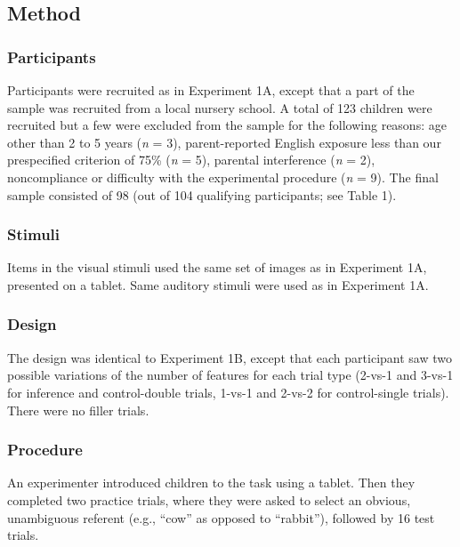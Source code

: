 \documentclass[a4paper,man,apacite,floatsintext]{apa6}
\begin{document}
\subsection{Method}\label{method-2}

\subsubsection{Participants}\label{participants-2}

Participants were recruited as in Experiment 1A, except that a part of
the sample was recruited from a local nursery school. A total of 123
children were recruited but a few were excluded from the sample for the
following reasons: age other than 2 to 5 years (\emph{n} = 3),
parent-reported English exposure less than our prespecified criterion of
75\% (\emph{n} = 5), parental interference (\emph{n} = 2), noncompliance
or difficulty with the experimental procedure (\emph{n} = 9). The final
sample consisted of 98 (out of 104 qualifying participants; see Table
1).

\subsubsection{Stimuli}\label{stimuli-1}

Items in the visual stimuli used the same set of images as in Experiment
1A, presented on a tablet. Same auditory stimuli were used as in
Experiment 1A.

\subsubsection{Design}\label{design}

The design was identical to Experiment 1B, except that each participant
saw two possible variations of the number of features for each trial
type (2-vs-1 and 3-vs-1 for inference and control-double trials, 1-vs-1
and 2-vs-2 for control-single trials). There were no filler trials.

\subsubsection{Procedure}\label{procedure-1}

An experimenter introduced children to the task using a tablet. Then
they completed two practice trials, where they were asked to select an
obvious, unambiguous referent (e.g., ``cow'' as opposed to ``rabbit''),
followed by 16 test trials.
\end{document}
